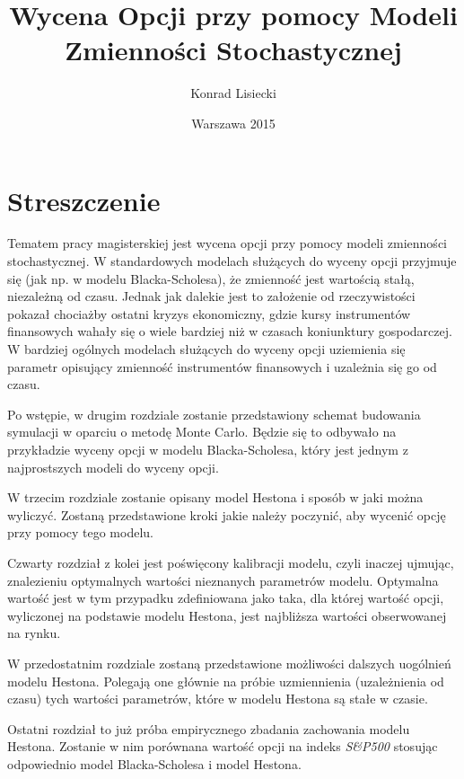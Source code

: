 \documentclass{pracamgr}
\author{Konrad Lisiecki}
\title{Wycena Opcji przy pomocy Modeli Zmienności Stochastycznej}
\date{Warszawa 2015}
\begin{document}
\maketitle
\nocite{book-full} 

\chapter*{Streszczenie} 


Tematem pracy magisterskiej jest wycena opcji przy pomocy modeli zmienności stochastycznej. 
W standardowych modelach służących do wyceny opcji przyjmuje się (jak np. w modelu 
Blacka-Scholesa), że zmienność jest wartością stałą, niezależną od czasu. 
Jednak jak dalekie jest to założenie od rzeczywistości pokazał chociażby ostatni kryzys 
ekonomiczny, gdzie kursy instrumentów finansowych wahały się o wiele bardziej niż w czasach
koniunktury gospodarczej. W bardziej ogólnych modelach służących do wyceny opcji uziemienia się parametr opisujący zmienność instrumentów finansowych i uzależnia się go od czasu. 


Po wstępie, w drugim rozdziale zostanie przedstawiony schemat budowania symulacji w oparciu o metodę Monte Carlo. Będzie się to odbywało na przykładzie wyceny opcji w modelu Blacka-Scholesa, który 
jest jednym z najprostszych modeli do wyceny opcji.

W trzecim rozdziale zostanie opisany model Hestona i sposób w jaki można wyliczyć. 
Zostaną przedstawione kroki jakie należy poczynić, aby wycenić opcję przy pomocy tego modelu.

Czwarty rozdział z kolei jest poświęcony kalibracji modelu, czyli inaczej ujmując, znalezieniu 
optymalnych wartości nieznanych parametrów modelu. Optymalna wartość jest w tym przypadku zdefiniowana
jako taka, dla której wartość opcji, wyliczonej na podstawie modelu Hestona, jest najbliższa wartości 
obserwowanej na rynku.

W przedostatnim rozdziale zostaną przedstawione możliwości dalszych uogólnień modelu Hestona. 
Polegają one głównie na próbie uzmiennienia (uzależnienia od czasu) tych wartości parametrów, które w 
modelu Hestona są stałe w czasie.

Ostatni rozdział to już próba empirycznego zbadania zachowania modelu Hestona. Zostanie w nim porównana
wartość opcji na indeks \textit{S\&P500} stosując odpowiednio model Blacka-Scholesa i model Hestona.
\end{document}
